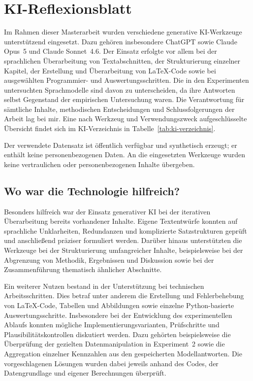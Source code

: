 \chapter{KI-Reflexionsblatt}

Im Rahmen dieser Masterarbeit wurden verschiedene generative KI-Werkzeuge unterstützend eingesetzt. Dazu gehören insbesondere ChatGPT sowie Claude Opus~5 und Claude Sonnet~4.6. Der Einsatz erfolgte vor allem bei der sprachlichen Überarbeitung von Textabschnitten, der Strukturierung einzelner Kapitel, der Erstellung und Überarbeitung von \LaTeX{}-Code sowie bei ausgewählten Programmier- und Auswertungsschritten. Die in den Experimenten untersuchten Sprachmodelle sind davon zu unterscheiden, da ihre Antworten selbst Gegenstand der empirischen Untersuchung waren. Die Verantwortung für sämtliche Inhalte, methodischen Entscheidungen und Schlussfolgerungen der Arbeit lag bei mir. Eine nach Werkzeug und Verwendungszweck aufgeschlüsselte Übersicht findet sich im KI-Verzeichnis in Tabelle~\ref{tab:ki-verzeichnis}.

Der verwendete Datensatz ist öffentlich verfügbar und synthetisch erzeugt; er enthält keine personenbezogenen Daten. An die eingesetzten Werkzeuge wurden keine vertraulichen oder personenbezogenen Inhalte übergeben.

\section{Wo war die Technologie hilfreich?}

Besonders hilfreich war der Einsatz generativer KI bei der iterativen Überarbeitung bereits vorhandener Inhalte. Eigene Textentwürfe konnten auf sprachliche Unklarheiten, Redundanzen und komplizierte Satzstrukturen geprüft und anschließend präziser formuliert werden. Darüber hinaus unterstützten die Werkzeuge bei der Strukturierung umfangreicher Inhalte, beispielsweise bei der Abgrenzung von Methodik, Ergebnissen und Diskussion sowie bei der Zusammenführung thematisch ähnlicher Abschnitte.

Ein weiterer Nutzen bestand in der Unterstützung bei technischen Arbeitsschritten. Dies betraf unter anderem die Erstellung und Fehlerbehebung von \LaTeX{}-Code, Tabellen und Abbildungen sowie einzelne Python-basierte Auswertungsschritte. Insbesondere bei der Entwicklung des experimentellen Ablaufs konnten mögliche Implementierungsvarianten, Prüfschritte und Plausibilitätskontrollen diskutiert werden. Dazu gehörten beispielsweise die Überprüfung der gezielten Datenmanipulation in Experiment~2 sowie die Aggregation einzelner Kennzahlen aus den gespeicherten Modellantworten. Die vorgeschlagenen Lösungen wurden dabei jeweils anhand des Codes, der Datengrundlage und eigener Berechnungen überprüft.

